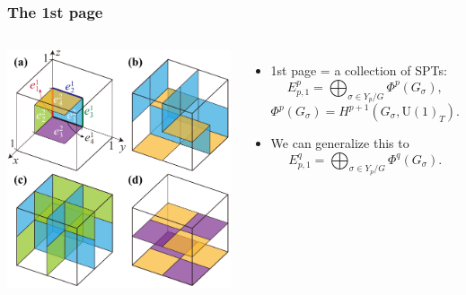\documentclass[xcolor=table, 11pt, aspectratio=169]{beamer}
\newcommand{\uone}{\mathrm U(1)}
\begin{document}
\begin{frame}
	\frametitle{The 1st page}

	\begin{columns}
		\begin{center}
			\includegraphics[width=\textwidth]{blocks}
		\end{center}
		\begin{itemize}
			\item 1st page = a collection of SPTs:
			\[E^p_{p,1} = \bigoplus_{\sigma\in Y_p/G} \Phi^p(G_\sigma),\]
			\[\Phi^p(G_\sigma) = H^{p+1}(G_\sigma, \uone_T).\]
			\item We can generalize this to
			\[E^q_{p,1} = \bigoplus_{\sigma\in Y_p/G} \Phi^q(G_\sigma).\]
		\end{itemize}
	\end{columns}
\end{frame}
\end{document}
